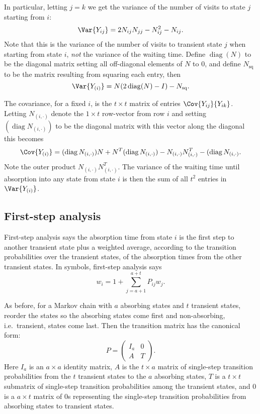 \documentclass[12pt]{article}
\begin{document}
In particular, letting \( j=k \) we get the variance of the number of
visits to state \( j \) starting from \( i \):
\[
    \Var{Y_{ij}} = 2 N_{ij}N_{jj} - N_{ij}^2 - N_{ij}.
\]  Note that this is the variance of the number of visits to transient
state \( j \) when starting from state \( i \), \emph{not} the variance of
the waiting time.
Define \(
\operatorname{diag}(N) \) to be the diagonal matrix setting all
off-diagonal elements of \( N \) to \( 0 \), and define \( N_{\text{sq}}
\) to be the matrix resulting from squaring each entry, then
\[
    \Var{Y_{(i)}} = N(2
    \operatorname{diag}
    (N) - I) - N_{\text{sq}}.
\]

The covariance, for a fixed \( i \), is the \( t \times t \)
matrix of entries \( \Cov{Y_{ij}}{ Y_{ik}} \).    Letting \( N_{(i,\cdot)} \) denote the \( 1
\times t \) row-vector from row \( i \) and setting \( (\operatorname{diag}
    N_{(i,\cdot)}) \) to be the diagonal matrix with this vector along the
    diagonal this becomes
\[
    \Cov{Y_{(i)}} =
    (\operatorname{diag}
    {N_{(i,\cdot)}}) N + N^T
    (\operatorname{diag}
    {N_{(i,\cdot)}}) - N_{(i,\cdot)} N_{(i,\cdot)}^T -
    (\operatorname{diag}
    N_{(i,\cdot)}.
\]  Note the outer product \( N_{(i,\cdot)} N_{(i,\cdot)}^T \).
The variance of the waiting time until absorption into any state from state \( i \)
is then the sum of all \( t^2 \) entries in \( \Var{Y_{(i)}} \).

\subsection*{First-step analysis}

First-step analysis%
says the absorption time from state \( i \) is the first step
to another transient state plus a weighted average, according to the
transition probabilities over the transient states, of the absorption
times from the other transient states.  In symbols, first-step analysis
says
\[
    w_i = 1 + \sum\limits_{j=a+1}^{a+t} P_{ij} w_j.
\]


As before, for a Markov chain with \( a \) absorbing states and \( t \)
transient states, reorder the states so the absorbing states come first
and non-absorbing, i.e.\ transient, states come last. Then the
transition matrix has the canonical form:
\[
    P =
    \begin{pmatrix}
        I_a & 0 \\
        A & T
    \end{pmatrix}
    .
\] Here \( I_{a} \) is an \( a \times a \) identity matrix, \( A \) is
the \( t \times a \) matrix of single-step transition probabilities from
the \( t \) transient states to the \( a \) absorbing states, \( T \) is
a \( t \times t \) submatrix of single-step transition probabilities
among the transient states, and \( 0 \) is a \( a \times t \) matrix of \(
0 \)s representing the single-step transition probabilities from
absorbing states to transient states.
\end{document}
